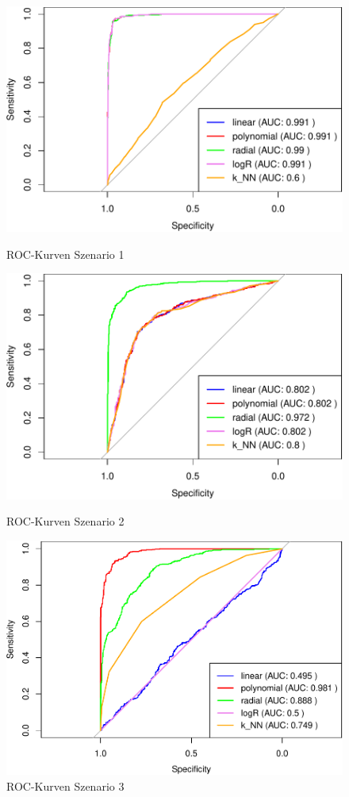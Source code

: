 \documentclass[
]{article}
\begin{document}
\begin{figure}[H]
\begin{minipage}{0.48\linewidth}
\centering
\includegraphics{Ergebnisse_files/figure-latex/S1ROC-1.pdf}
\caption{ROC-Kurven Szenario 1}
\label{fig:S1ROC}
\end{minipage}
\hfill
\begin{minipage}{0.48\linewidth}
\centering
\includegraphics{Ergebnisse_files/figure-latex/S2ROC-1.pdf}
\caption{ROC-Kurven Szenario 2}
\label{fig:S2ROC}
\end{minipage}
\vspace*{0.5cm}\newline
\begin{minipage}{\linewidth}
\centering
\includegraphics[width=0.48\linewidth]{Ergebnisse_files/figure-latex/S3ROC-1.pdf}
\caption{ROC-Kurven Szenario 3}
\label{fig:S3ROC}
\end{minipage}
\end{figure}
\end{document}

